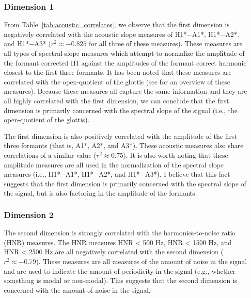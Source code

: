 \subsubsection{Dimension 1} \label{sec:acousticlandscape:dim1}
From Table~\ref{tab:acoustic_correlates}, we observe that the first dimension is negatively correlated with the acoustic slope measures of H1*$-$A1*, H1*$-$A2*, and H1*$-$A3* ($r^{2} \approx -0.825$ for all three of these measures). These measures are all types of spectral slope measures which attempt to normalize the amplitude of the formant corrected H1 against the amplitudes of the formant correct harmonic closest to the first three formants. It has been noted that these measures are correlated with the open-quotient of the glottis (see \cite{garellekPhoneticsVoice2019,garellekTheoreticalAchievementsPhonetics2022} for an overview of these measures). Because these measures all capture the same information and they are all highly correlated with the first dimension, we can conclude that the first dimension is primarily concerned with the spectral slope of the signal (i.e., the open-quotient of the glottis). 

The first dimension is also positively correlated with the amplitude of the first three formants (that is, A1*, A2*, and A3*). These acoustic measures also share correlations of a similar value ($r^{2} \approx 0.75$). It is also worth noting that these amplitude measures are all used in the normalization of the spectral slope measures (i.e., H1*$-$A1*, H1*$-$A2*, and H1*$-$A3*). I believe that this fact suggests that the first dimension is primarily concerned with the spectral slope of the signal, but is also factoring in the amplitude of the formants.

\subsubsection{Dimension 2} \label{sec:acousticlandscape:dim2}
The second dimension is strongly correlated with the harmonics-to-noise ratio (HNR) measures. The HNR measures HNR < 500 Hz, HNR < 1500 Hz, and HNR < 2500 Hz are all negatively correlated with the second dimension ($r^{2} \approx -0.79$). These measures are all measures of the amount of noise in the signal and are used to indicate the amount of periodicity in the signal (e.g., whether something is modal or non-modal). This suggests that the second dimension is concerned with the amount of noise in the signal.

